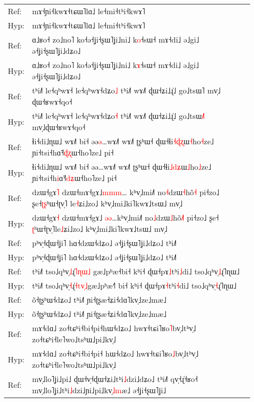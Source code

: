 \documentclass[10pt]{article}
\DeclareRobustCommand{\hl}[1]{{\textcolor{red}{#1}}}
\begin{document}
\begin{longtable}{ll}
\midrule 
Ref: & mɤ˧ɲi˧kwɤ˧tɕɯ˥lɑ˩ le˧mi˧tʰi˧kwɤ˥ \\ 
Hyp: & mɤ˧ɲi˧kwɤ˧tɕɯ˥lɑ˩ le˧mi˧tʰi˧kwɤ˥ \\ 
\midrule 
Ref: & ɑ˩ʁo˧ zo˩no˥ ko˧ə˧ʝi˧ʂɯ˥ʝi˩ni˩ k\hl{o}˧sɯ˧ mɤ˧di˩ ə˩gi˩ ə˧ʝi˧ʂɯ˥ʝi˩dʑo˩ \\ 
Hyp: & ɑ˩ʁo˧ zo˩no˥ ko˧ə˧ʝi˧ʂɯ˥ʝi˩ni˩ k\hl{ɤ}˧sɯ˧ mɤ˧di˩ ə˩gi˩ ə˧ʝi˧ʂɯ˥ʝi˩dʑo˩ \\ 
\midrule 
Ref: & tʰi˩˥ le˧qʰwɤ˧ le˧qʰwɤ˧dʑo\hl{˩} tʰi˩˥ wɤ˩˥ ɖɯ˧ʑi˩ɻ̍˩ go˩tsɯ˥ mv̩˩\hl{ }ɖɯ˧ʁwɤ˧qo˧ \\ 
Hyp: & tʰi˩˥ le˧qʰwɤ˧ le˧qʰwɤ˧dʑo\hl{˧} tʰi˩˥ wɤ˩˥ ɖɯ˧ʑi˩ɻ̍˩ go˩tsɯ\hl{˩}˥ mv̩˩ɖɯ˧ʁwɤ˧qo˧ \\ 
\midrule 
Ref: & ɬi˧di˩ɳɯ˩ wɤ˩˥ bi˧ əə\hl{ə}…wɤ˩˥ wɤ˩˥ ʈʂʰɯ˧ ɖɯ˧ɬi\hl{˧}\hl{ɖ}\hl{ʐ}ɯ\hl{˧}ho\hl{˧}ze˩ ɲi˧tsi˧hɑ̃˧\hl{ɖ}\hl{ʐ}ɯ˧ho˥ze˩ pi˧ \\ 
Hyp: & ɬi˧di˩ɳɯ˩ wɤ˩˥ bi˧ əə…wɤ˩˥ wɤ˩˥ ʈʂʰɯ˧ ɖɯ˧ɬi\hl{˩}\hl{d}\hl{ʑ}ɯ\hl{˩}ho\hl{˩}ze˩ ɲi˧tsi˧h\hl{i}ɑ̃˧\hl{d}\hl{ʑ}ɯ˧ho˥ze˩ pi˧ \\ 
\midrule 
Ref: & dzɯ˧gɤ\hl{˥} dzɯ˧mɤ˧gɤ˩\hl{m}\hl{m}\hl{m}…\hl{ }kʰv̩˩mi˩˥ no\hl{˧}dzɯ\hl{˧}hõ\hl{˧} pi˧zo˩ ʂe˧\hl{ʈ}\hl{ʂ}ʰɯ˧ʈv̩˥\hl{ }le\hl{˧}ʑi˩zo˩ kʰv̩˩mi˩ki˥kwɤ˩tsɯ˩ mv̩˩ \\ 
Hyp: & dzɯ˧gɤ\hl{˧} dzɯ˧mɤ˧gɤ˩\hl{ }\hl{ə}\hl{ə}…kʰv̩˩mi˩˥ no\hl{˩}dzɯ\hl{˩}hõ\hl{˩}\hl{˥} pi˧zo˩ ʂe˧\hl{ }\hl{ʈ}ʰɯ˧ʈv̩˥le\hl{˩}ʑi˩zo˩ kʰv̩˩mi˩ki˥kwɤ˩tsɯ˩ mv̩˩ \\ 
\midrule 
Ref: & pʰv̩˧ɖɯ˧ʝi˥ hɑ˧dzɯ˧dʑo˩ ə˧ʝi˧ʂɯ˥ʝi˩dʑo˩ tʰi˩˥ \\ 
Hyp: & pʰv̩˧ɖɯ˧ʝi˥ hɑ˧dzɯ˧dʑo˩ ə˧ʝi˧ʂɯ˥ʝi˩dʑo˩ tʰi˩˥ \\ 
\midrule 
Ref: & tʰi˩˥ tso˩qʰv̩\hl{˩}ɻ̍\hl{˥}\hl{ɳ}\hl{ɯ}\hl{˩}\hl{ }gæ˩pʰæ˧bi˧ kʰi˧ ɖɯ˧pɤ\hl{˩}tʰi\hl{˩}di˩ tso˩qʰv̩\hl{˩}ɻ̍˥ɳɯ˩ \\ 
Hyp: & tʰi˩˥ tso˩qʰv̩\hl{˧}ɻ̍\hl{˧}\hl{t}\hl{v}\hl{̩}\hl{˩}gæ˩pʰæ˧\hl{˥}\hl{ }bi˧ kʰi˧ ɖɯ˧pɤ\hl{˧}tʰi\hl{˧}di˩ tso˩qʰv̩\hl{˧}ɻ̍˥ɳɯ˩ \\ 
\midrule 
Ref: & õ˧ʈʂʰɯ˧dʑo˩ tʰi˩˥ ɲi˧ʈʂæ˧ʑi˧dɑ˥kv̩˩ze˩mæ˩ \\ 
Hyp: & õ˧ʈʂʰɯ˧dʑo˩ tʰi˩˥ ɲi˧ʈʂæ˧ʑi˧dɑ˥kv̩˩ze˩mæ˩ \\ 
\midrule 
Ref: & mɤ˧dɑ˩ zo˧tɕʰi˧bi˧pi˧hɯ˧dʑo˩ hwɤ˧tɕi˥ʁo\hl{˥}bv̩˩tʰv̩˩ zo˧tɕʰi˧le˥wo˩tsʰɯ˩pi˩kv̩˩ \\ 
Hyp: & mɤ˧dɑ˩ zo˧tɕʰi˧bi˧pi˧\hl{ }hɯ˧dʑo˩ hwɤ˧tɕi˥ʁo\hl{˩}bv̩˩tʰv̩˩ zo˧tɕʰi˧le˥wo˩tsʰɯ˩pi˩kv̩˩ \\ 
\midrule 
Ref: & mv̩˩lo˥ʝi˩pi˩ ɖɯ˧v̩˧ɖɯ˧ʑi˩tʰi\hl{˩}dzi˩dʑo˩ tʰi˩˥ qv̩˧ɻ̍˧ʁo˧ mv̩˩lo˥ʝi˩tʰi\hl{˩}dzi˩ɲi˩pi˩kv̩\hl{˩}\hl{m}æ˩ ə˧ʝi˧ʂɯ˥ʝi˩ \\ 

\end{longtable}
\end{document}
